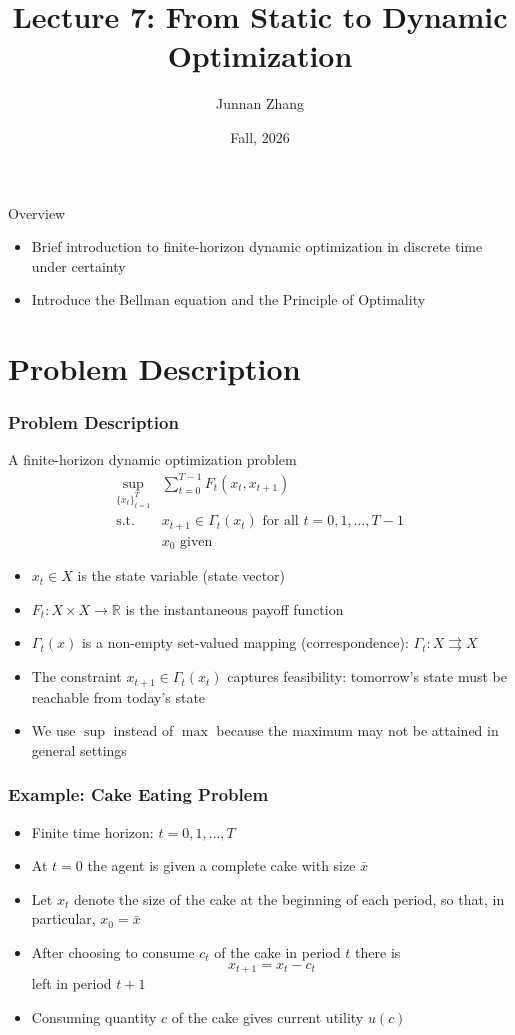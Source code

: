 \documentclass[9pt,aspectratio=169]{beamer}
\title{Lecture 7: From Static to Dynamic Optimization}
\date{}
\author{Junnan Zhang} %
\institute[Paula and Gregory Chow Institute for Studies in Economics\\
Xiamen University] %
{
	Paula and Gregory Chow Institute for Studies in Economics \\ Xiamen University  \\ %
	\medskip
}
\date{Fall, 2026} %
\newcommand{\R}{\mathbb{R}}
\begin{document}
\frame{\titlepage}


\begin{frame}{Overview}
    \begin{itemize}
        \item Brief introduction to finite-horizon dynamic optimization in
        discrete time under certainty
        \item Introduce the Bellman equation and the Principle of Optimality
    \end{itemize}
\end{frame}

\section{Problem Description}

\begin{frame}
    \frametitle{Problem Description}
    A finite-horizon dynamic optimization problem
    \begin{align*}
        \sup_{\{x_t\}_{t=1}^{T}} &\sum_{t=0}^{T-1}F_t(x_t, x_{t+1})\\
        \text{s.t. }
        &x_{t+1} \in \Gamma_t(x_t) \text{ for all } t = 0, 1, \ldots, T-1\\
        &x_0 \text{ given}
    \end{align*}
    \small
    \begin{itemize}
        \item $x_t \in X$ is the state variable (state vector)
        \item $F_t:X \times X \to \R$ is the instantaneous payoff function
        \item $\Gamma_t(x)$ is a non-empty set-valued mapping (correspondence):
        $\Gamma_t: X \rightrightarrows X$
        \item The constraint $x_{t+1} \in \Gamma_t(x_t)$ captures
        feasibility: tomorrow's state must be reachable from today's state
        \item We use $\sup$ instead of $\max$ because the maximum may not be
        attained in general settings
    \end{itemize}
\end{frame}

\begin{frame}
    \frametitle{Example: Cake Eating Problem}
    \begin{itemize}
        \item Finite time horizon: $t = 0, 1, \ldots, T$
        \item At $t=0$ the agent is given a complete cake with size $\bar x$
        \item Let $x_t$ denote the size of the cake at the beginning of each
        period, so that, in particular, $x_0=\bar x$
        \item After choosing to consume $c_t$ of the cake in period $t$ there is
        $$
        x_{t+1} = x_t - c_t
        $$
        left in period $t+1$
        \item Consuming quantity $c$ of the cake gives current utility
        $u(c)$
    \end{itemize}
\end{frame}
\end{document}
